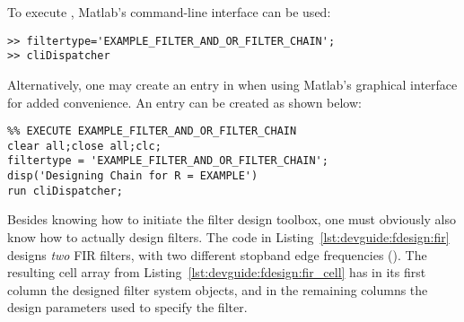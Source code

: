 To  execute ,  Matlab's  command-line  interface can  be
used:
\begin{tcolorbox}[
    skin=alpenlisting,
    title={
        \refstepcounter{listing}
        \textbf{Listing \thelisting:} Calling \code{cliDispatcher.m} from Matlab's Commandline Interface
        \label{lst:devguide:fdesign:fir_cell}
        \addcontentsline{lol}{listing}{\protect\numberline{\thelisting}Calling \code{cliDispatcher.m} from Matlab's Commandline Interface}
    }
]
\begin{verbatim}
>> filtertype='EXAMPLE_FILTER_AND_OR_FILTER_CHAIN';
>> cliDispatcher
\end{verbatim}
\end{tcolorbox}
\noindent Alternatively, one  may create an entry  in  when
using Matlab's graphical interface for added convenience. An entry can be created
as shown  below:
\begin{tcolorbox}[
    skin=alpenlisting,
    title={
        \refstepcounter{listing}
        \textbf{Listing \thelisting:} Creating an Entry for \code{cliDispatcher.m} in \code{guiWrapper.m}
        \label{lst:devguide:fdesign:fir_cell}
        \addcontentsline{lol}{listing}{\protect\numberline{\thelisting}Creating an Entry for \code{cliDispatcher.m} in \code{guiWrapper.m}}
    }
]
\begin{verbatim}
%% EXECUTE EXAMPLE_FILTER_AND_OR_FILTER_CHAIN
clear all;close all;clc;
filtertype = 'EXAMPLE_FILTER_AND_OR_FILTER_CHAIN';
disp('Designing Chain for R = EXAMPLE')
run cliDispatcher;
\end{verbatim}
\end{tcolorbox}

Besides  knowing  how  to  initiate   the  filter  design  toolbox,  one  must
obviously  also   know  how   to  actually  design   filters.   The   code  in
Listing~\ref{lst:devguide:fdesign:fir}  designs \emph{two}  FIR filters,  with
two  different stopband  edge  frequencies ().   The resulting  cell
array   from  Listing~\ref{lst:devguide:fdesign:fir_cell} has  in its
first column the designed filter system  objects, and in the remaining columns
the design parameters used to specify the filter.

